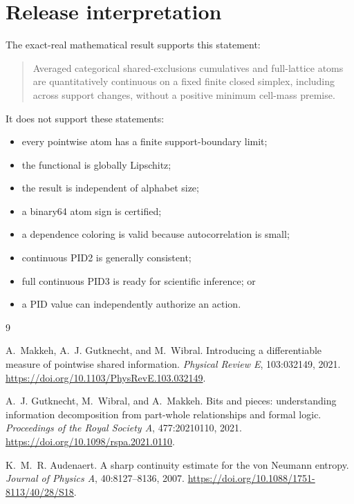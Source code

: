 \documentclass[11pt]{article}
\theoremstyle{definition}
\begin{document}
\section{Release interpretation}

The exact-real mathematical result supports this statement:
\begin{quote}
Averaged categorical shared-exclusions cumulatives and full-lattice atoms are quantitatively
continuous on a fixed finite closed simplex, including across support changes, without a positive
minimum cell-mass premise.
\end{quote}

It does not support these statements:
\begin{itemize}[leftmargin=2em]
  \item every pointwise atom has a finite support-boundary limit;
  \item the functional is globally Lipschitz;
  \item the result is independent of alphabet size;
  \item a binary64 atom sign is certified;
  \item a dependence coloring is valid because autocorrelation is small;
  \item continuous PID2 is generally consistent;
  \item full continuous PID3 is ready for scientific inference; or
  \item a PID value can independently authorize an action.
\end{itemize}

\begin{thebibliography}{9}

A.~Makkeh, A.~J. Gutknecht, and M.~Wibral.
\newblock Introducing a differentiable measure of pointwise shared information.
\newblock \emph{Physical Review E}, 103:032149, 2021.
\newblock \url{https://doi.org/10.1103/PhysRevE.103.032149}.

A.~J. Gutknecht, M.~Wibral, and A.~Makkeh.
\newblock Bits and pieces: understanding information decomposition from part-whole relationships
and formal logic.
\newblock \emph{Proceedings of the Royal Society A}, 477:20210110, 2021.
\newblock \url{https://doi.org/10.1098/rspa.2021.0110}.

K.~M.~R. Audenaert.
\newblock A sharp continuity estimate for the von Neumann entropy.
\newblock \emph{Journal of Physics A}, 40:8127--8136, 2007.
\newblock \url{https://doi.org/10.1088/1751-8113/40/28/S18}.

\end{thebibliography}
\end{document}
